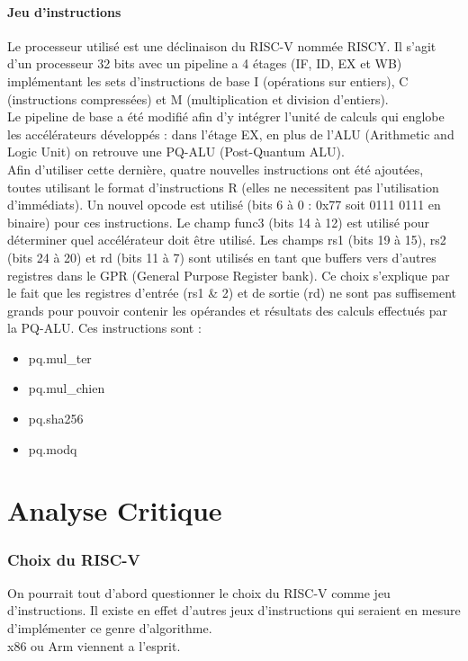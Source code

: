 \documentclass[10pt,a4paper]{article}
\begin{document}
\subsection{Jeu d'instructions}
Le processeur utilisé est une déclinaison du RISC-V nommée RISCY. Il s'agit d'un processeur 32 bits avec un pipeline a 4 étages (IF, ID, EX et WB) implémentant les sets d'instructions de base
I (opérations sur entiers), C (instructions compressées) et M (multiplication et division d'entiers).\\
Le pipeline de base a été modifié afin d'y intégrer l'unité de calculs qui englobe les accélérateurs développés : dans l'étage EX, en plus de l'ALU (Arithmetic and Logic Unit) on retrouve une 
PQ-ALU (Post-Quantum ALU). \\ 
Afin d'utiliser cette dernière, quatre nouvelles instructions ont été ajoutées, toutes utilisant le format d'instructions R (elles ne necessitent pas l'utilisation d'immédiats). Un nouvel opcode 
est utilisé (bits 6 à 0 : 0x77 soit 0111 0111 en binaire) pour ces instructions. Le champ func3 (bits 14 à 12) est utilisé pour déterminer quel accélérateur doit être utilisé. Les champs rs1 (bits 
19 à 15), rs2 (bits 24 à 20) et rd (bits 11 à 7) sont utilisés en tant que buffers vers d'autres registres dans le GPR (General Purpose Register bank). Ce choix s'explique par le fait que les registres 
d'entrée (rs1 \& 2) et de sortie (rd) ne sont pas suffisement grands pour pouvoir contenir les opérandes et résultats des calculs effectués par la PQ-ALU. Ces instructions sont :\\
\begin{itemize}
    \item pq.mul\_ter
    \item pq.mul\_chien 
    \item pq.sha256 
    \item pq.modq
\end{itemize}
\newpage
\part{Analyse Critique}

\section{Choix du RISC-V}

On pourrait tout d'abord questionner le choix du RISC-V comme jeu d'instructions. Il existe en effet d'autres jeux d'instructions qui seraient en mesure d'implémenter ce genre d'algorithme.\\
x86 ou Arm viennent a l'esprit. 
\end{document}
